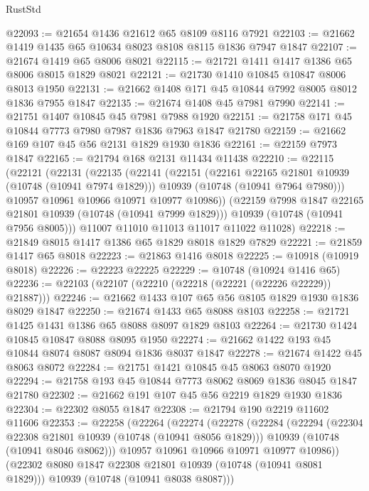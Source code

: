 \begin{lexlean}{RustStd}
\begin{coremodule}
{\begin{coremodule}
{{{{{@22093 := @21654 @1436 @21612 @65 @8109 @8116 @7921
@22103 := @21662 @1419 @1435 @65 @10634 @8023 @8108 @8115 @1836 @7947 @1847
@22107 := @21674 @1419 @65 @8006 @8021
@22115 := @21721 @1411 @1417 @1386 @65 @8006 @8015 @1829 @8021
@22121 := @21730 @1410 @10845 @10847 @8006 @8013 @1950
@22131 := @21662 @1408 @171 @45 @10844 @7992 @8005 @8012 @1836 @7955 @1847
@22135 := @21674 @1408 @45 @7981 @7990
@22141 := @21751 @1407 @10845 @45 @7981 @7988 @1920
@22151 := @21758 @171 @45 @10844 @7773 @7980 @7987 @1836 @7963 @1847 @21780
@22159 := @21662 @169 @107 @45 @56 @2131 @1829 @1930 @1836
@22161 := @22159 @7973 @1847
@22165 := @21794 @168 @2131 @11434 @11438
@22210 := @22115
    (@22121
      (@22131
        (@22135
          (@22141
            (@22151
              (@22161 @22165 @21801 @10939 (@10748 (@10941 @7974 @1829)))
              @10939
              (@10748 (@10941 @7964 @7980)))
            @10957
            @10961
            @10966
            @10971
            @10977
            @10986))
        (@22159 @7998 @1847 @22165 @21801 @10939 (@10748 (@10941 @7999 @1829)))
        @10939
        (@10748 (@10941 @7956 @8005)))
      @11007
      @11010
      @11013
      @11017
      @11022
      @11028)
@22218 := @21849 @8015 @1417 @1386 @65 @1829 @8018 @1829 @7829
@22221 := @21859 @1417 @65 @8018
@22223 := @21863 @1416 @8018
@22225 := @10918 (@10919 @8018)
@22226 := @22223 @22225
@22229 := @10748 (@10924 @1416 @65)
@22236 := @22103 (@22107 (@22210 (@22218 (@22221 (@22226 @22229)) @21887)))
@22246 := @21662 @1433 @107 @65 @56 @8105 @1829 @1930 @1836 @8029 @1847
@22250 := @21674 @1433 @65 @8088 @8103
@22258 := @21721 @1425 @1431 @1386 @65 @8088 @8097 @1829 @8103
@22264 := @21730 @1424 @10845 @10847 @8088 @8095 @1950
@22274 := @21662 @1422 @193 @45 @10844 @8074 @8087 @8094 @1836 @8037 @1847
@22278 := @21674 @1422 @45 @8063 @8072
@22284 := @21751 @1421 @10845 @45 @8063 @8070 @1920
@22294 := @21758 @193 @45 @10844 @7773 @8062 @8069 @1836 @8045 @1847 @21780
@22302 := @21662 @191 @107 @45 @56 @2219 @1829 @1930 @1836
@22304 := @22302 @8055 @1847
@22308 := @21794 @190 @2219 @11602 @11606
@22353 := @22258
    (@22264
      (@22274
        (@22278
          (@22284
            (@22294
              (@22304 @22308 @21801 @10939 (@10748 (@10941 @8056 @1829)))
              @10939
              (@10748 (@10941 @8046 @8062)))
            @10957
            @10961
            @10966
            @10971
            @10977
            @10986))
        (@22302 @8080 @1847 @22308 @21801 @10939 (@10748 (@10941 @8081 @1829)))
        @10939
        (@10748 (@10941 @8038 @8087)))
}}}}}
\end{coremodule}}
\end{coremodule}
\end{lexlean}
